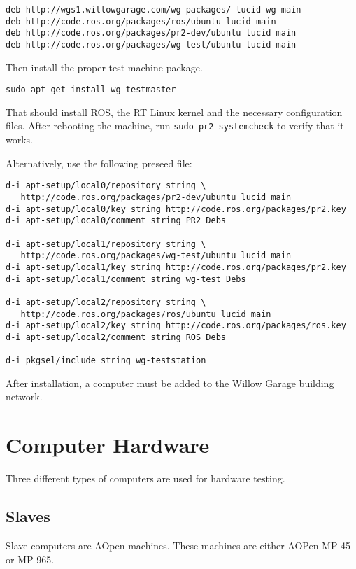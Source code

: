 \documentclass[11pt]{report}
\begin{document}
\begin{verbatim}
deb http://wgs1.willowgarage.com/wg-packages/ lucid-wg main
deb http://code.ros.org/packages/ros/ubuntu lucid main
deb http://code.ros.org/packages/pr2-dev/ubuntu lucid main
deb http://code.ros.org/packages/wg-test/ubuntu lucid main
\end{verbatim}

Then install the proper test machine package.
\begin{verbatim}
sudo apt-get install wg-testmaster
\end{verbatim}
That should install ROS, the RT Linux kernel and the necessary configuration files. After rebooting the machine, run \texttt{sudo pr2-systemcheck} to verify that it works.

Alternatively, use the following preseed file:
\begin{verbatim}
d-i apt-setup/local0/repository string \
   http://code.ros.org/packages/pr2-dev/ubuntu lucid main
d-i apt-setup/local0/key string http://code.ros.org/packages/pr2.key
d-i apt-setup/local0/comment string PR2 Debs

d-i apt-setup/local1/repository string \
   http://code.ros.org/packages/wg-test/ubuntu lucid main
d-i apt-setup/local1/key string http://code.ros.org/packages/pr2.key
d-i apt-setup/local1/comment string wg-test Debs

d-i apt-setup/local2/repository string \
   http://code.ros.org/packages/ros/ubuntu lucid main
d-i apt-setup/local2/key string http://code.ros.org/packages/ros.key
d-i apt-setup/local2/comment string ROS Debs

d-i pkgsel/include string wg-teststation
\end{verbatim}

After installation, a computer must be added to the Willow Garage building network.


\section{Computer Hardware}

Three different types of computers are used for hardware testing.

\subsection{Slaves}

Slave computers are AOpen machines. These machines are either AOPen MP-45 or MP-965. 
\end{document}
